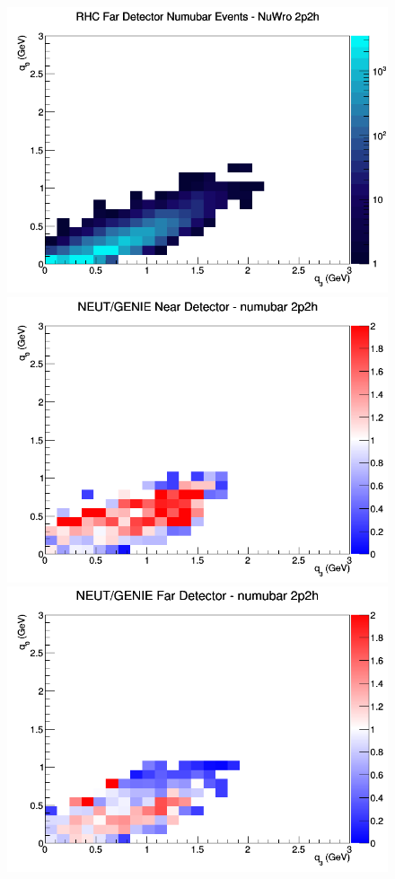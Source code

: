 \begin{figure}[h]
\endminipage
{}
\includegraphics[width=\linewidth]{eff_q0_q3/GAr/2p2h_RHC_FD_numubar_q3_q0_NuWro.png}
\endminipage
\newline
{}
\includegraphics[width=\linewidth]{eff_q0_q3/GAr/ratios/2p2h_NEUT_GENIE_numubar_near_q3_q0.png}
\endminipage
{}
\includegraphics[width=\linewidth]{eff_q0_q3/GAr/ratios/2p2h_NEUT_GENIE_numubar_far_q3_q0.png}

\end{figure}
